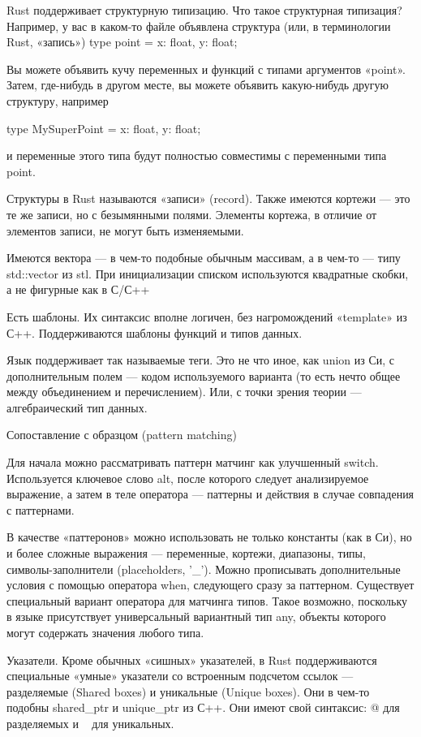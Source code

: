 \documentclass[12pt]{article}
\begin{document}
Rust поддерживает структурную типизацию. Что такое структурная типизация? Например, у вас в каком-то файле объявлена структура (или, в терминологии Rust, «запись»)
type point = {x: float, y: float};

Вы можете объявить кучу переменных и функций с типами аргументов «point». Затем, где-нибудь в другом месте, вы можете объявить какую-нибудь другую структуру, например

type MySuperPoint = {x: float, y: float};

и переменные этого типа будут полностью совместимы с переменными типа point.

Структуры в Rust называются «записи» (record). Также имеются кортежи — это те же записи, но с безымянными полями. Элементы кортежа, в отличие от элементов записи, не могут быть изменяемыми. 

Имеются вектора — в чем-то подобные обычным массивам, а в чем-то — типу std::vector из stl. При инициализации списком используются квадратные скобки, а не фигурные как в С/С++

Есть шаблоны. Их синтаксис вполне логичен, без нагромождений «template» из С++. Поддерживаются шаблоны функций и типов данных.

Язык поддерживает так называемые теги. Это не что иное, как union из Си, с дополнительным полем — кодом используемого варианта (то есть нечто общее между объединением и перечислением). Или, с точки зрения теории — алгебраический тип данных.

Сопоставление с образцом (pattern matching)

Для начала можно рассматривать паттерн матчинг как улучшенный switch. Используется ключевое слово alt, после которого следует анализируемое выражение, а затем в теле оператора — паттерны и действия в случае совпадения с паттернами.

В качестве «паттеронов» можно использовать не только константы (как в Си), но и более сложные выражения — переменные, кортежи, диапазоны, типы, символы-заполнители (placeholders, '\_'). Можно прописывать дополнительные условия с помощью оператора when, следующего сразу за паттерном. Существует специальный вариант оператора для матчинга типов. Такое возможно, поскольку в языке присутствует универсальный вариантный тип any, объекты которого могут содержать значения любого типа.

Указатели. Кроме обычных «сишных» указателей, в Rust поддерживаются специальные «умные» указатели со встроенным подсчетом ссылок — разделяемые (Shared boxes) и уникальные (Unique boxes). Они в чем-то подобны shared\_ptr и unique\_ptr из С++. Они имеют свой синтаксис: @ для разделяемых и ~ для уникальных.
\end{document}
